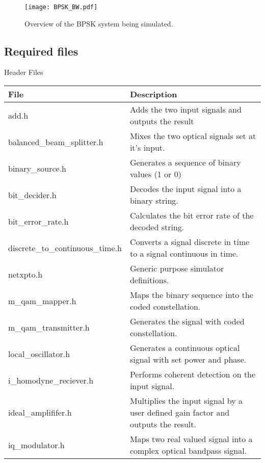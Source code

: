 \begin{figure}[h]
\centering
\texttt{[image: BPSK\_BW.pdf]}
\caption{Overview of the BPSK system being simulated.}
\label{fig:homodynesystem}
\end{figure}

\subsection*{Required files}\label{Required files}

Header Files

\begin{table}[H]
\centering
\begin{tabulary}{1.0\textwidth}{|p{6cm}|L|}
\hline
\textbf{File}              & \textbf{Description} 				                  \\ \hline
add.h                      & Adds the two input signals and outputs the result    \\ \hline
balanced\_beam\_splitter.h & Mixes the two optical signals set at it's input.     \\ \hline
binary\_source.h           & Generates a sequence of binary values (1 or 0)       \\ \hline
bit\_decider.h             & Decodes the input signal into a binary string.       \\ \hline
bit\_error\_rate.h         & Calculates the bit error rate of the decoded string. \\ \hline
discrete\_to\_continuous\_time.h &  Converts a signal discrete in time to a signal continuous in time. \\ \hline
netxpto.h                  & Generic purpose simulator definitions.	              \\ \hline
m\_qam\_mapper.h           & Maps the binary sequence into the coded constellation. \\ \hline
m\_qam\_transmitter.h      & Generates the signal with coded constellation.       \\ \hline
local\_oscillator.h        & Generates a continuous optical signal with set power and phase. \\ \hline
i\_homodyne\_reciever.h    & Performs coherent detection on the input signal.     \\ \hline
ideal\_amplififer.h        & Multiplies the input signal by a user defined gain factor and outputs the result. \\ \hline
iq\_modulator.h            & Maps two real valued signal into a complex optical bandpass  signal. \\ \hline

\end{tabulary}
\end{table}
